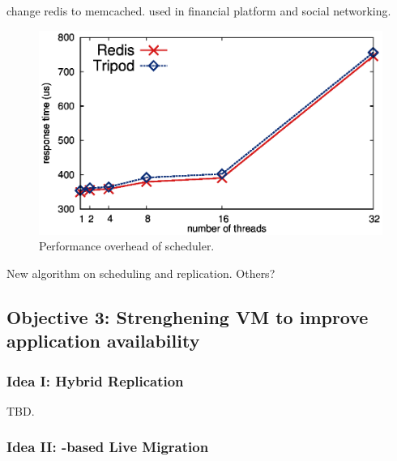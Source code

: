  change redis to memcached. used in financial 
platform and social networking.

\begin{figure}[!htb]
\centering
\includegraphics[width=0.34\textheight]{figures/scheduler_latency.ps}
        \vspace{0.1in}
        \caption{Performance overhead of scheduler.}
        \label{fig:scheduler-latency}
\end{figure}

 New algorithm on scheduling and replication. Others?

\vspace{-.15in}\subsection{Objective 3: 
Strenghening VM to improve application 
availability}\label{sec:defense}\vspace{-.075in}


\vspace{-.15in}\subsubsection{Idea I: Hybrid Replication} 
\label{sec:defense-arch}\vspace{-.075in}

TBD.

\vspace{-.15in}\subsubsection{Idea II: \paxos-based Live Migration} 
\label{sec:defense-arch}\vspace{-.075in}

